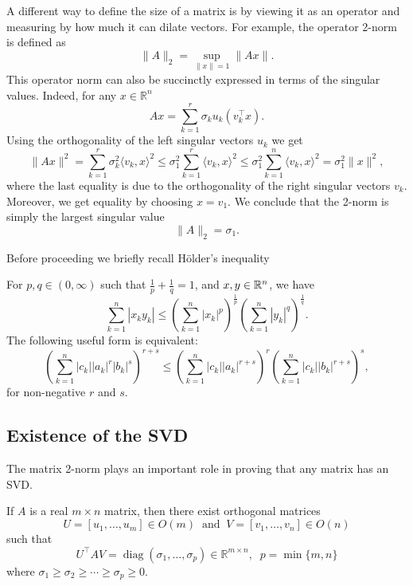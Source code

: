 A different way to define the size of a matrix is by viewing it as an operator and measuring by how much it can dilate vectors. For example, the operator 2-norm is defined as
\begin{equation}
\|A\|_2 = \sup_{\|x\|=1}\|A x\|.
\end{equation}
This operator norm can also be succinctly expressed in terms of the singular values. Indeed, for any $x \in \mathbb{R}^n$
\begin{equation}
Ax = \sum_{k=1}^r \sigma_k u_k (v_k^\top   x).
\end{equation}
Using the orthogonality of the left singular vectors $u_k$ we get
\begin{equation}
\|Ax \|^2 = \sum_{k=1}^r \sigma_k^2 \langle v_k , x \rangle^2 \leq \sigma_1^2 \sum_{k=1}^r \langle v_k, x \rangle^2 \leq \sigma_1^2 \sum_{k=1}^n \langle v_k, x \rangle^2 = \sigma_1^2 \|x\|^2,
\end{equation}
where the last equality is due to the orthogonality of the right singular vectors $v_k$. Moreover, we get equality by choosing $x=v_1$. We conclude that the 2-norm is simply the largest singular value
\begin{equation}
\|A\|_2 = \sigma_1.
\end{equation}

Before proceeding we briefly recall H\"older's inequality
\begin{proposition}\label{prop:holderineq}
For $p,q\in(0,\infty)$ such that $\frac1p+\frac1q=1$, and $x,y\in\mathbb{R}^n$, we have
\[
\sum_{k=1}^n|x_ky_k| \leq \left( \sum_{k=1}^n|x_k|^p \right)^{\frac1p} \left( \sum_{k=1}^n|y_k|^q \right)^{\frac1q}.
\]
The following useful form is equivalent:
\begin{equation}\label{eq:HolderRS}
\left(\sum_{k=1}^n|c_k||a_k|^r|b_k|^s\right)^{r+s} \leq \left( \sum_{k=1}^n|c_k||a_k|^{r+s} \right)^{r} \left( \sum_{k=1}^n|c_k||b_k|^{r+s} \right)^{s},
\end{equation}
for non-negative $r$ and $s$.
\end{proposition}

\subsection{Existence of the SVD}
The matrix 2-norm plays an important role in proving that any matrix has an SVD.
\begin{theorem}
If $A$ is a real $m \times n$ matrix, then there
exist orthogonal matrices
$$U = [u_1, \ldots , u_m] \in O(m) \;\; \text{and} \;\; V = [v_1,\ldots, v_n] \in O(n)$$
such that
$$U^\top  AV = \operatorname{diag}(\sigma_1,\ldots,\sigma_p) \in \mathbb{R}^{m\times n},\;\; p = \min\{m,n\}$$
where $\sigma_1 \geq \sigma_2 \geq \cdots \geq \sigma_p \geq 0$.
\end{theorem}

